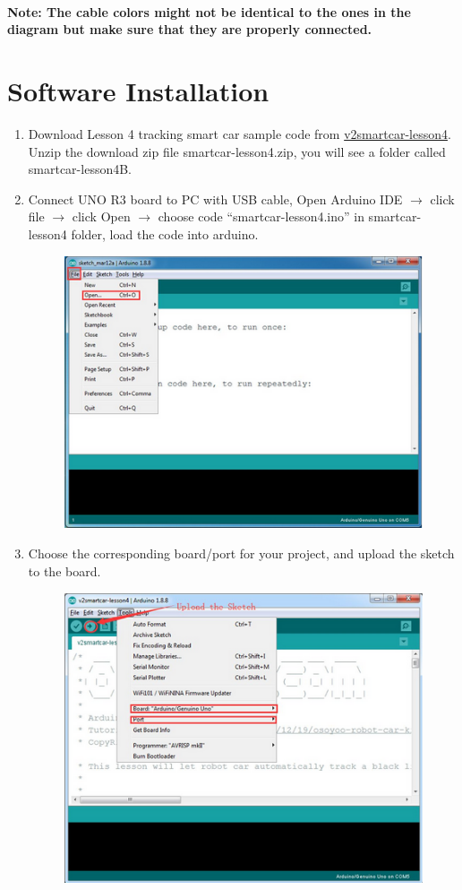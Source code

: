 \documentclass{article}
\begin{document}
\paragraph{} \textbf{Note: The cable colors might not be identical to the ones in the diagram but make sure that they are properly connected.}

\section{Software Installation}


\begin{enumerate}
	\item Download Lesson 4 tracking smart car sample code from \href{example.com}{v2smartcar-lesson4}. Unzip the download zip file smartcar-lesson4.zip, you will see a folder called smartcar-lesson4B.
	
	\item Connect UNO R3 board to PC with USB cable, Open Arduino IDE $\rightarrow$ click file $\rightarrow$ click Open $\rightarrow$ choose code “smartcar-lesson4.ino” in smartcar-lesson4 folder, load the code into arduino.
	
	\begin{figure}[H]
		\centering
		\includegraphics[width=0.7\linewidth]{Images/s2}
		\label{fig:s2}
	\end{figure}
	
	
	\item Choose the corresponding board/port for your project, and upload the sketch to the board.
	
	\begin{figure}[H]
		\centering
		\includegraphics[width=0.7\linewidth]{Images/s3}
		\label{fig:s3}
	\end{figure}
	

\end{enumerate}
\end{document}
